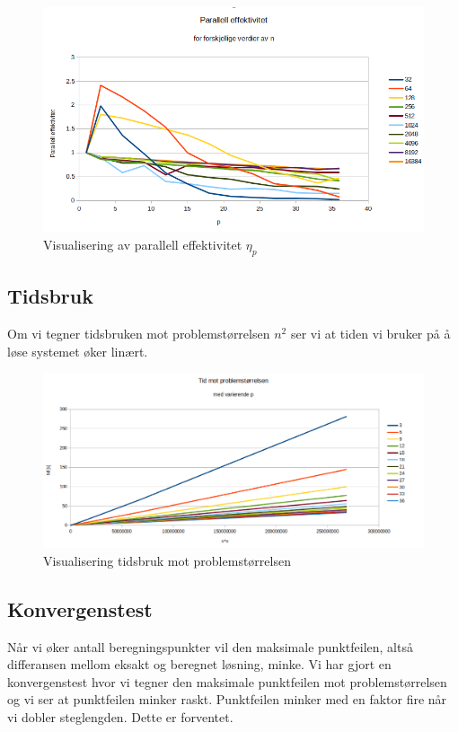 \documentclass[11pt,norsk,a4paper]{article}
\begin{document}
\begin{figure}[h]
\centering
\includegraphics[scale=0.5]{plot_parallell.png}
\caption{Visualisering av parallell effektivitet $\eta_p$}
\end{figure}

\subsection{Tidsbruk}

Om vi tegner tidsbruken mot problemstørrelsen $n^2$ ser vi at tiden vi bruker på å løse systemet øker linært.

\begin{figure}[h]
\centering
\includegraphics[scale=0.4]{plot_tid_p.png}
\caption{Visualisering tidsbruk mot problemstørrelsen}
\end{figure}



\subsection{Konvergenstest}
Når vi øker antall beregningspunkter vil den maksimale punktfeilen, altså differansen mellom eksakt og beregnet løsning, minke. Vi har gjort en konvergenstest hvor vi tegner den maksimale punktfeilen mot problemstørrelsen og vi ser at punktfeilen minker raskt. Punktfeilen minker med en faktor fire når vi dobler steglengden. Dette er forventet.
\end{document}
